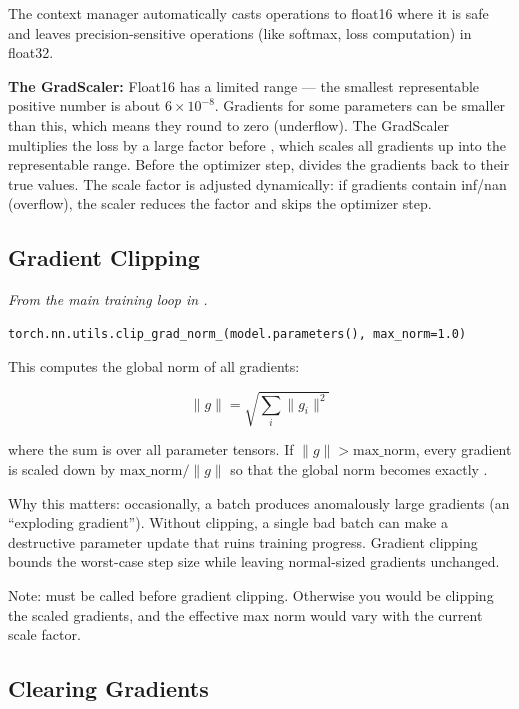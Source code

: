 The  context manager automatically casts operations to float16 where it is safe and leaves precision-sensitive operations (like softmax, loss computation) in float32.

\textbf{The GradScaler:} Float16 has a limited range --- the smallest representable positive number is about $6 \times 10^{-8}$. Gradients for some parameters can be smaller than this, which means they round to zero (underflow). The GradScaler multiplies the loss by a large factor before , which scales all gradients up into the representable range. Before the optimizer step,  divides the gradients back to their true values. The scale factor is adjusted dynamically: if gradients contain inf/nan (overflow), the scaler reduces the factor and skips the optimizer step.

\subsection{Gradient Clipping}

\concepttag
{\small\itshape From the main training loop in .}
\begin{lstlisting}
torch.nn.utils.clip_grad_norm_(model.parameters(), max_norm=1.0)
\end{lstlisting}

This computes the global norm of all gradients:

\[\|g\| = \sqrt{\sum_i \|g_i\|^2}\]

where the sum is over all parameter tensors. If $\|g\| > \text{max\_norm}$, every gradient is scaled down by $\text{max\_norm} / \|g\|$ so that the global norm becomes exactly .

Why this matters: occasionally, a batch produces anomalously large gradients (an ``exploding gradient''). Without clipping, a single bad batch can make a destructive parameter update that ruins training progress. Gradient clipping bounds the worst-case step size while leaving normal-sized gradients unchanged.

Note:  must be called before gradient clipping. Otherwise you would be clipping the scaled gradients, and the effective max norm would vary with the current scale factor.

\subsection{Clearing Gradients}

